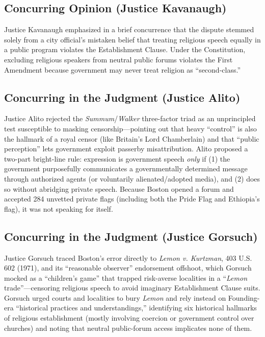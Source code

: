 \documentclass[12pt]{article}
\begin{document}
\subsection{Concurring Opinion (Justice Kavanaugh)}

Justice Kavanaugh emphasized in a brief concurrence that the dispute stemmed solely from a city official's mistaken belief that treating religious speech equally in a public program violates the Establishment Clause. Under the Constitution, excluding religious speakers from neutral public forums violates the First Amendment because government may never treat religion as ``second-class.''

\subsection{Concurring in the Judgment (Justice Alito)}

Justice Alito rejected the \textit{Summum}/\textit{Walker} three-factor triad as an unprincipled test susceptible to masking censorship---pointing out that heavy ``control'' is also the hallmark of a royal censor (like Britain's Lord Chamberlain) and that ``public perception'' lets government exploit passerby misattribution. Alito proposed a two-part bright-line rule: expression is government speech \emph{only} if (1) the government purposefully communicates a governmentally determined message through authorized agents (or voluntarily alienated/adopted media), and (2) does so without abridging private speech. Because Boston opened a forum and accepted 284 unvetted private flags (including both the Pride Flag and Ethiopia's flag), it was not speaking for itself.

\subsection{Concurring in the Judgment (Justice Gorsuch)}

Justice Gorsuch traced Boston's error directly to \textit{Lemon v. Kurtzman}, 403 U.S. 602 (1971), and its ``reasonable observer'' endorsement offshoot, which Gorsuch mocked as a ``children's game'' that trapped risk-averse localities in a ``\textit{Lemon} trade''---censoring religious speech to avoid imaginary Establishment Clause suits. Gorsuch urged courts and localities to bury \textit{Lemon} and rely instead on Founding-era ``historical practices and understandings,'' identifying six historical hallmarks of religious establishment (mostly involving coercion or government control over churches) and noting that neutral public-forum access implicates none of them.
\end{document}
